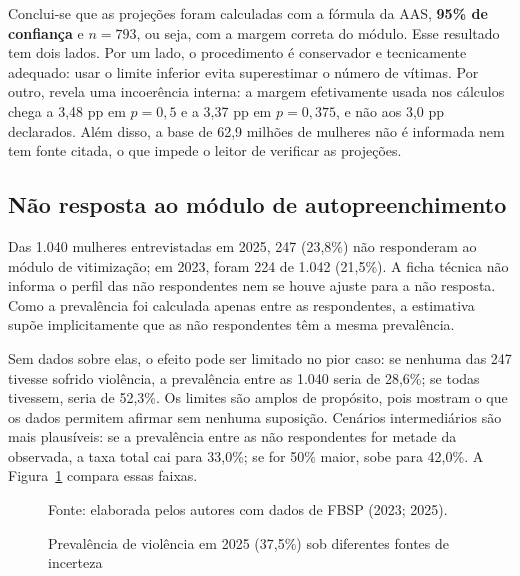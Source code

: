 \documentclass[12pt,a4paper]{article}
\newcommand{\fonte}[1]{%
  \vspace{-2mm}
  \begin{center}\footnotesize Fonte: #1\end{center}
}
\newcommand{\fontedados}{elaborada pelos autores com dados de FBSP (2023; 2025).}
\begin{document}
Conclui-se que as projeções foram calculadas com a fórmula da AAS, \textbf{95\% de confiança} e $n = 793$, ou seja, com a margem correta do módulo. Esse resultado tem dois lados. Por um lado, o procedimento é conservador e tecnicamente adequado: usar o limite inferior evita superestimar o número de vítimas. Por outro, revela uma incoerência interna: a margem efetivamente usada nos cálculos chega a 3,48 pp em $p = 0{,}5$ e a 3,37 pp em $p = 0{,}375$, e não aos 3,0 pp declarados. Além disso, a base de 62,9 milhões de mulheres não é informada nem tem fonte citada, o que impede o leitor de verificar as projeções.

\subsection{Não resposta ao módulo de autopreenchimento}

Das 1.040 mulheres entrevistadas em 2025, 247 (23,8\%) não responderam ao módulo de vitimização; em 2023, foram 224 de 1.042 (21,5\%). A ficha técnica não informa o perfil das não respondentes nem se houve ajuste para a não resposta. Como a prevalência foi calculada apenas entre as respondentes, a estimativa supõe implicitamente que as não respondentes têm a mesma prevalência.

Sem dados sobre elas, o efeito pode ser limitado no pior caso: se nenhuma das 247 tivesse sofrido violência, a prevalência entre as 1.040 seria de 28,6\%; se todas tivessem, seria de 52,3\%. Os limites são amplos de propósito, pois mostram o que os dados permitem afirmar sem nenhuma suposição. Cenários intermediários são mais plausíveis: se a prevalência entre as não respondentes for metade da observada, a taxa total cai para 33,0\%; se for 50\% maior, sobe para 42,0\%. A Figura~\ref{fig:intervalos} compara essas faixas.

\begin{figure}[H]
\centering
\caption{Prevalência de violência em 2025 (37,5\%) sob diferentes fontes de incerteza}
\label{fig:intervalos}
\fonte{\fontedados}
\end{figure}
\end{document}
